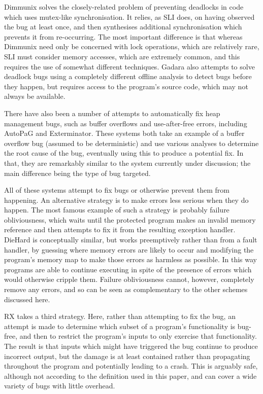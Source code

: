 \documentclass[10pt,letter,twocolumn]{sigplanconf}
\begin{document}
Dimmunix\cite{Jula2008} solves the closely-related problem of
preventing deadlocks in code which uses mutex-like synchronisation.
It relies, as SLI does, on having observed the bug at least once, and
then synthesises additional synchronisation which prevents it from
re-occurring.  The most important difference is that whereas Dimmunix
need only be concerned with lock operations, which are relatively
rare, SLI must consider memory accesses, which are extremely common,
and this requires the use of somewhat different techniques.
Gadara\cite{Wang2008} also attempts to solve deadlock bugs using a
completely different offline analysis to detect bugs before they
happen, but requires access to the program's source code, which may
not always be available.

There have also been a number of attempts to automatically fix heap
management bugs, such as buffer overflows and use-after-free errors,
including AutoPaG\cite{Lin2007} and Exterminator\cite{Novark2007}.
These systems both take an example of a buffer overflow bug (assumed
to be deterministic) and use various analyses to determine the root
cause of the bug, eventually using this to produce a potential fix.
In that, they are remarkably similar to the system currently under
discussion; the main difference being the type of bug targeted.

All of these systems attempt to fix bugs or otherwise prevent them
from happening.  An alternative strategy is to make errors less
serious when they do happen.  The most famous example of such a
strategy is probably failure obliviousness\cite{Rinard2004}, which
waits until the protected program makes an invalid memory reference
and then attempts to fix it from the resulting exception handler.
DieHard\cite{Berger2006} is conceptually similar, but works
preemptively rather than from a fault handler, by guessing where
memory errors are likely to occur and modifying the program's memory
map to make those errors as harmless as possible.  In this way
programs are able to continue executing in spite of the presence of
errors which would otherwise cripple them.  Failure obliviousness
cannot, however, completely remove any errors, and so can be seen as
complementary to the other schemes discussed here.

RX\cite{Qin2007} takes a third strategy.  Here, rather than
attempting to fix the bug, an attempt is made to determine which
subset of a program's functionality is bug-free, and then to restrict
the program's inputs to only exercise that functionality.  The result
is that inputs which might have triggered the bug continue to produce
incorrect output, but the damage is at least contained rather than
propagating throughout the program and potentially leading to a crash.
This is arguably safe, although not according to the definition used
in this paper, and can cover a wide variety of bugs with little
overhead.
\end{document}
